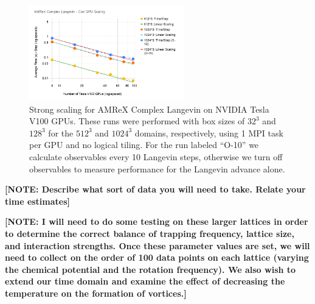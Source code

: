 \documentclass[onecolumn, 12pt]{report}
\newcommand{\note}[1]{{\color{red} \bf[NOTE: #1]}}
\begin{document}
%
\begin{figure}[h]
\centering
\includegraphics[width=0.6\textwidth]{./AMReX_Complex_Langevin_Cori_GPU_Scaling.png}
	\caption{\label{Fig:GPUScaling} Strong scaling for AMReX Complex Langevin on NVIDIA Tesla V100 GPUs. These runs were performed with box sizes of $32^3$ and $128^3$ for the $512^3$ and $1024^3$ domains, respectively, using 1 MPI task per GPU and no logical tiling. For the run labeled ``O-10'' we calculate observables every 10 Langevin steps, otherwise we turn off observables to measure performance for the Langevin advance alone.\vspace{-3mm}}
\end{figure}
%


\note{Describe what sort of data you will need to take. Relate your time estimates}

\note{I will need to do some testing on these larger lattices in order to determine the correct balance of trapping frequency, lattice size, and interaction strengths. Once these parameter values are set, we will need to collect on the order of 100 data points on each lattice (varying the chemical potential and the rotation frequency). We also wish to extend our time domain and examine the effect of decreasing the temperature on the formation of vortices.}
\end{document}
